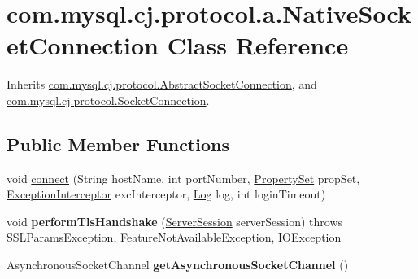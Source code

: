 \hypertarget{classcom_1_1mysql_1_1cj_1_1protocol_1_1a_1_1_native_socket_connection}{}\section{com.\+mysql.\+cj.\+protocol.\+a.\+Native\+Socket\+Connection Class Reference}
\label{classcom_1_1mysql_1_1cj_1_1protocol_1_1a_1_1_native_socket_connection}


Inherits \mbox{\hyperlink{classcom_1_1mysql_1_1cj_1_1protocol_1_1_abstract_socket_connection}{com.\+mysql.\+cj.\+protocol.\+Abstract\+Socket\+Connection}}, and \mbox{\hyperlink{interfacecom_1_1mysql_1_1cj_1_1protocol_1_1_socket_connection}{com.\+mysql.\+cj.\+protocol.\+Socket\+Connection}}.

\subsection*{Public Member Functions}
\begin{DoxyCompactItemize}
\item 
void \mbox{\hyperlink{classcom_1_1mysql_1_1cj_1_1protocol_1_1a_1_1_native_socket_connection_a01b21bd9bd524d07d1467c758900a102}{connect}} (String host\+Name, int port\+Number, \mbox{\hyperlink{interfacecom_1_1mysql_1_1cj_1_1conf_1_1_property_set}{Property\+Set}} prop\+Set, \mbox{\hyperlink{interfacecom_1_1mysql_1_1cj_1_1exceptions_1_1_exception_interceptor}{Exception\+Interceptor}} exc\+Interceptor, \mbox{\hyperlink{interfacecom_1_1mysql_1_1cj_1_1log_1_1_log}{Log}} log, int login\+Timeout)
\item 
\mbox{\label{classcom_1_1mysql_1_1cj_1_1protocol_1_1a_1_1_native_socket_connection_a00e90b14ed518b12733a936a3b707134}} 
void {\bfseries perform\+Tls\+Handshake} (\mbox{\hyperlink{interfacecom_1_1mysql_1_1cj_1_1protocol_1_1_server_session}{Server\+Session}} server\+Session)  throws S\+S\+L\+Params\+Exception, Feature\+Not\+Available\+Exception, I\+O\+Exception 
\item 
\mbox{\label{classcom_1_1mysql_1_1cj_1_1protocol_1_1a_1_1_native_socket_connection_a2c48d7701f27174e67e79cee1deb78d1}} 
Asynchronous\+Socket\+Channel {\bfseries get\+Asynchronous\+Socket\+Channel} ()
\end{DoxyCompactItemize}
